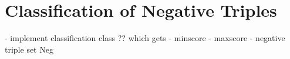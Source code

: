 \section{Classification of Negative Triples}
\label{sec:classification}



- implement classification class ?? which gets
    - minscore
    - maxscore
    - negative triple set Neg